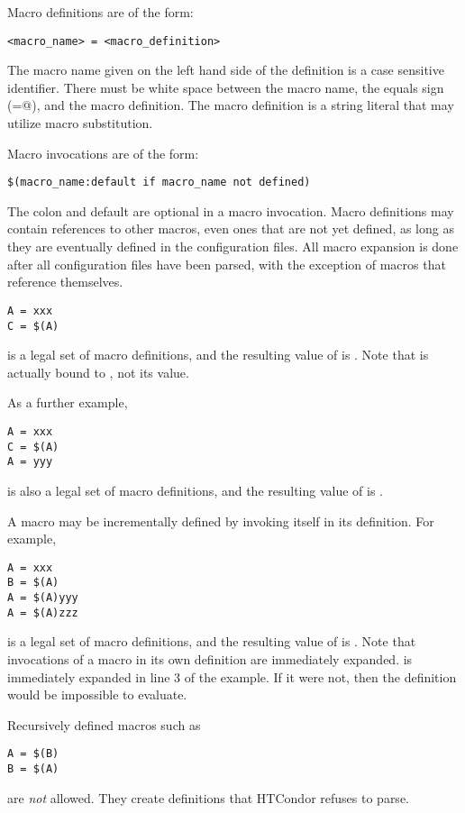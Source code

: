 
Macro definitions are of the form:
\begin{verbatim}
<macro_name> = <macro_definition>
\end{verbatim}

The macro name given on the left hand side of the definition is
a case sensitive identifier.
There must be white space between the macro name, the
equals sign (\verb@=@), and the macro definition.
The macro definition is a string literal that may utilize macro substitution.

Macro invocations are of the form: 
\begin{verbatim}
$(macro_name:default if macro_name not defined)
\end{verbatim}

The colon and default are optional in a macro invocation.
Macro definitions may contain references to other macros, even ones
that are not yet defined, as long as they are eventually defined in
the configuration files.
All macro expansion is done after all configuration files have been parsed,
with the exception of macros that reference themselves.

\begin{verbatim}
A = xxx
C = $(A) 
\end{verbatim}
is a legal set of macro definitions, and the resulting value of 
 is
.
Note that
 is actually bound to 
, not its value.

As a further example,
\begin{verbatim}
A = xxx
C = $(A)
A = yyy
\end{verbatim}
is also a legal set of macro definitions, and the resulting value of
 is .  

A macro may be incrementally defined by invoking itself in its
definition.  For example,
\begin{verbatim}
A = xxx
B = $(A)
A = $(A)yyy
A = $(A)zzz
\end{verbatim}
is a legal set of macro definitions, and the resulting value of 
is .
Note that invocations of a macro in
its own definition are immediately
expanded.
 is immediately expanded in line 3 of the example.
If it were not, then the definition would be impossible to
evaluate.

Recursively defined macros such as
\begin{verbatim}
A = $(B)
B = $(A)
\end{verbatim}
are \emph{not} allowed.
They create definitions that HTCondor refuses to parse. 

